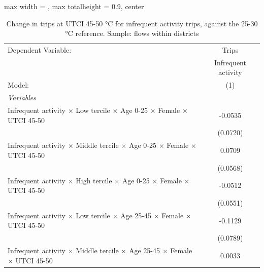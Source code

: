 
\begin{table}[htbp]
   \caption{\label{table_intersectionality_infrequent_activity_45-50} Change in trips at UTCI 45-50 °C for infrequent activity trips, against the 25-30 °C reference. Sample: flows within districts}
   \centering
   \small
   \begin{adjustbox}{max width = \textwidth, max totalheight = 0.9\textheight, center}
      \begin{tabular}{lc}
         \tabularnewline \midrule \midrule
         Dependent Variable:                                                                                     & Trips\\  
                                                                                                                 & Infrequent activity \\   
         Model:                                                                                                  & (1)\\  
         \midrule
         \emph{Variables}\\
         Infrequent activity $\times$ Low tercile $\times$ Age 0-25 $\times$ Female $\times$ UTCI 45-50          & -0.0535\\   
                                                                                                                 & (0.0720)\\   
         Infrequent activity $\times$ Middle tercile $\times$ Age 0-25 $\times$ Female $\times$ UTCI 45-50       & 0.0709\\   
                                                                                                                 & (0.0568)\\   
         Infrequent activity $\times$ High tercile $\times$ Age 0-25 $\times$ Female $\times$ UTCI 45-50         & -0.0512\\   
                                                                                                                 & (0.0551)\\   
         Infrequent activity $\times$ Low tercile $\times$ Age 25-45 $\times$ Female $\times$ UTCI 45-50         & -0.1129\\   
                                                                                                                 & (0.0789)\\   
         Infrequent activity $\times$ Middle tercile $\times$ Age 25-45 $\times$ Female $\times$ UTCI 45-50      & 0.0033\\   

\end{tabular}
\end{adjustbox}
\end{table}
